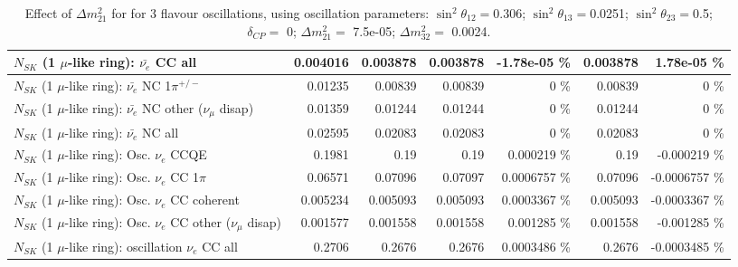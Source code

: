 \begin{table}
\begin{tabular}{| l | r | r | r  r | r  r |}
                            $N_{SK}$ (1 $\mu$-like ring): $\bar{\nu_{e}}$ CC all &        0.004016 &        0.003878 &        0.003878 & -1.78e-05 \%  &        0.003878 & 1.78e-05 \%  \\ 
\hline
                     $N_{SK}$ (1 $\mu$-like ring): $\bar{\nu_e}$ NC 1$\pi^{+/-}$ &         0.01235 &         0.00839 &         0.00839 &        0 \%  &         0.00839 &        0 \%  \\ 
          $N_{SK}$ (1 $\mu$-like ring): $\bar{\nu_e}$ NC other ($\nu_\mu$ disap) &         0.01359 &         0.01244 &         0.01244 &        0 \%  &         0.01244 &        0 \%  \\ 
                            $N_{SK}$ (1 $\mu$-like ring): $\bar{\nu_{e}}$ NC all &         0.02595 &         0.02083 &         0.02083 &        0 \%  &         0.02083 &        0 \%  \\ 
\hline
\hline
\hline
                                 $N_{SK}$ (1 $\mu$-like ring): Osc. $\nu_e$ CCQE &          0.1981 &            0.19 &            0.19 & 0.000219 \%  &            0.19 & -0.000219 \%  \\ 
                            $N_{SK}$ (1 $\mu$-like ring): Osc. $\nu_e$ CC 1$\pi$ &         0.06571 &         0.07096 &         0.07097 & 0.0006757 \%  &         0.07096 & -0.0006757 \%  \\ 
                          $N_{SK}$ (1 $\mu$-like ring): Osc. $\nu_e$ CC coherent &        0.005234 &        0.005093 &        0.005093 & 0.0003367 \%  &        0.005093 & -0.0003367 \%  \\ 
           $N_{SK}$ (1 $\mu$-like ring): Osc. $\nu_e$ CC other ($\nu_\mu$ disap) &        0.001577 &        0.001558 &        0.001558 & 0.001285 \%  &        0.001558 & -0.001285 \%  \\ 
                        $N_{SK}$ (1 $\mu$-like ring): oscillation $\nu_e$ CC all &          0.2706 &          0.2676 &          0.2676 & 0.0003486 \%  &          0.2676 & -0.0003485 \%  \\ 
\hline
\hline
\end{tabular}
\caption{ Effect of $\Delta m^2_{21}$ for for 3 flavour oscillations, using oscillation parameters:  $\sin^2\theta_{12} = $0.306; $\sin^2\theta_{13} = $0.0251; $\sin^2\theta_{23} = $0.5; $\delta_{CP} = $        0; $\Delta m^2_{21} = $    7.5e-05; $\Delta m^2_{32} = $    0.0024. }
\label{tab:num_dm12sq_1RmuT_3f_osc_t13:0.0251}
\end{table}
\clearpage

